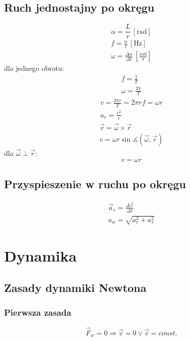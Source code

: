 \documentclass{article}
\numberwithin{equation}{section}
\newcommand{\unit}[1]{\, \left[\mathrm{#1}\right]}
\begin{document}
    \subsection{Ruch jednostajny po okręgu}
      \begin{equation}
        \alpha = \frac Lr \unit{rad}
      \end{equation}
      \begin{gather}
        f = \frac nt \unit{Hz}\\
        \omega = \frac{\Delta\alpha}{\Delta t} \unit{\frac{rad}{s}}
      \end{gather}
      dla jednego obrotu:
      \begin{gather}
        f = \frac 1T\\
        \omega = \frac{2\pi}{T}
      \end{gather}
      \begin{gather}
        v = \frac{2\pi r}{T} = 2\pi rf = \omega r\\
        a_r = \frac{v^2}{r}
      \end{gather}
      \begin{gather}
        \vec v = \vec\omega \times \vec r\\
        v = \omega r\sin\measuredangle(\vec\omega, \vec r)
      \end{gather}
      dla $\vec\omega \perp \vec r$:
      \begin{equation}
        v = \omega r
      \end{equation}
    \subsection{Przyspieszenie w ruchu po okręgu}
      \begin{gather}
        \vec a_s = \frac{\Delta\vec v}{\Delta t}\\
        a_w = \sqrt{a_r^2 + a_s^2}
      \end{gather}

  \newpage
  \section{Dynamika}
    \subsection{Zasady dynamiki Newtona}
      \subsubsection{Pierwsza zasada}
        \begin{equation}
          \vec F_w = 0 \Rightarrow \vec v = 0 \lor \vec v = const.
        \end{equation}
\end{document}
